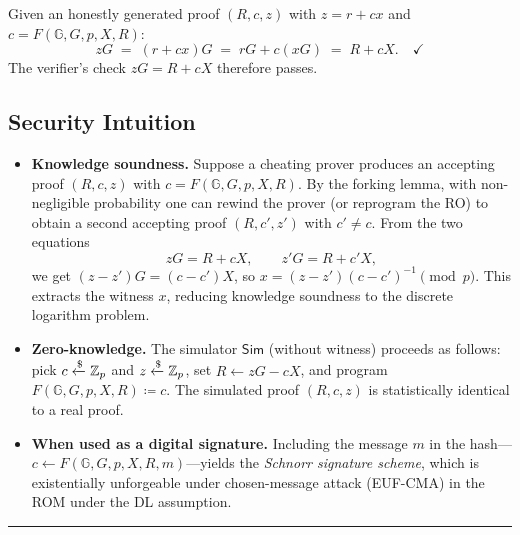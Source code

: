\documentclass[11pt]{article}
\begin{document}
Given an honestly generated proof $(R,c,z)$ with $z = r + cx$ and
$c = F(\mathbb{G},G,p,X,R)$:
\[
  zG \;=\; (r + cx)G \;=\; rG + c(xG) \;=\; R + cX. \quad\checkmark
\]
The verifier's check $zG = R + cX$ therefore passes.

\subsection{Security Intuition}

\begin{itemize}
  \item \textbf{Knowledge soundness.}  Suppose a cheating prover
        produces an accepting proof $(R,c,z)$ with $c = F(\mathbb{G},G,p,X,R)$.
        By the forking lemma, with non-negligible probability one can
        rewind the prover (or reprogram the RO) to obtain a second
        accepting proof $(R,c',z')$ with $c' \neq c$.  From the two
        equations
        \[
          zG = R + cX, \qquad z'G = R + c'X,
        \]
        we get $(z-z')G = (c-c')X$, so
        $x = (z-z')(c-c')^{-1} \pmod{p}$.
        This extracts the witness $x$, reducing knowledge soundness to
        the discrete logarithm problem.

  \item \textbf{Zero-knowledge.}  The simulator $\mathsf{Sim}$ (without
        witness) proceeds as follows: pick $c \xleftarrow{\$} \mathbb{Z}_p$ and
        $z \xleftarrow{\$} \mathbb{Z}_p$, set $R \leftarrow zG - cX$, and
        program $F(\mathbb{G},G,p,X,R) \coloneqq c$.  The simulated
        proof $(R,c,z)$ is statistically identical to a real proof.

  \item \textbf{When used as a digital signature.}  Including the
        message $m$ in the hash---$c \leftarrow
        F(\mathbb{G},G,p,X,R,m)$---yields the \emph{Schnorr signature
        scheme}, which is existentially unforgeable under chosen-message
        attack (EUF-CMA) in the ROM under the DL assumption.
\end{itemize}

\bigskip
\hrule
\bigskip
\end{document}
